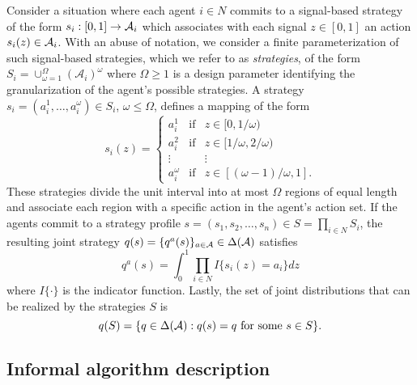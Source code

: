 Consider a situation where each agent $i \in N$ commits to a signal-based strategy of the form $s_i : [0,1] \rightarrow {\cal A}_i$ which associates with each signal $z \in [0,1]$ an action $s_i(z) \in {\cal A}_i$.  With an abuse of notation, we consider a finite parameterization of such signal-based strategies, which we refer to as \emph{strategies}, of the form $S_i = \cup_{\omega=1}^\Omega (\mathcal{A}_i)^\omega$ 
where $\Omega \geq 1$ is a design parameter identifying the granularization of the agent's possible strategies.  A strategy $s_i = (a_i^1,\ldots,a_i^\omega) \in S_i$, $\omega \leq \Omega$, defines a mapping of the form
%
\begin{equation}
%
s_i(z) = \left\{ \begin{array}{ccl} 
a_i^1 & \text{if} & z \in [0,1/\omega) \\ 
a_i^2 & \text{if} & z \in [1/\omega,2/\omega) \\
\vdots & & \vdots \\
a_i^\omega & \text{if} & z \in [(\omega-1)/\omega,1]. 
\end{array}
\right. 
%
\end{equation} 
%
These strategies divide the unit interval into at most $\Omega$ regions of equal length and associate each region with a specific action in the agent's action set.  If the agents commit to a strategy profile $s = (s_1, s_2, \dots, s_n) \in S = \prod_{i \in N} S_i$, the resulting joint strategy $q(s)=\{q^a(s)\}_{a \in {\cal A}} \in \Delta({\cal A})$ satisfies
%
$$ q^a(s) = \int_{0}^1 \prod_{i \in N} I \{s_i(z) = a_i\} dz $$
%
where $I\{\cdot\}$ is the indicator function.  Lastly, the set of joint distributions that can be realized by the strategies $S$ is
%
$$ q(S) = \{ q \in \Delta({{\cal A}}) : q(s) = q \ \text{for some} \ s \in S \}. $$
 
\subsection{Informal algorithm description}\label{s:algorithm}

